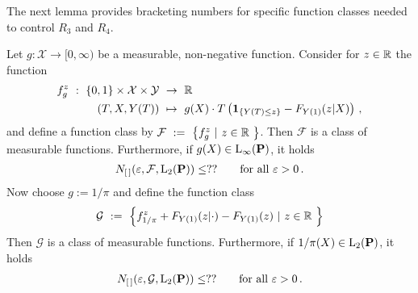 The next lemma provides bracketing numbers for specific function classes needed to control $R_3$ and $R_4$.
\newpage
\begin{lemma}
  Let
  $
  g
  :
  \mathcal{X}\to [0,\infty)
  $
  be a measurable, non-negative function.
  Consider for $z\in\R$ the function
  \begin{align*}
    f_{g}^z
    \ 
    :
    \ 
      \left\{ 0,1 \right\}
      \times
      \mathcal{X}
      \times
      \mathcal{Y}
    &
    \ 
    \to
    \ 
    \R
    \\
      (T,X,Y(T))
    &
      \ 
      \mapsto
      \ 
      g(X)
      \cdot
      T
      \left( 
        \mathbf{1}
        _{\left\{ Y(T)\le z \right\}}
        -
        F_{Y(1)}(z|X)
      \right)
      \,,
  \end{align*}
  and define a function class by
  $
    \mathcal{F}
    \ 
    :=
    \ 
    \left\{ 
      f_{g}^z
      \ 
      |
      \ 
      z\in\R\ 
    \right\}
  $.
  Then $\mathcal{F}$ is a class of measurable functions. 
  Furthermore, if $g(X)\in\mathrm{L}_\infty(\P)$, it holds 
  \begin{gather*}
    N_{[\,]}(\varepsilon,\mathcal{F},\mathrm{L}_2(\P))
    \le
    ??
    \qquad
    \text{for all}
    \ 
    \varepsilon>0
    \,.
  \end{gather*}
  Now choose $g:=1/\pi$ and define the function class
  \begin{gather*}
    \mathcal{G}
    \ 
    :=
    \ 
    \left\{ 
      f_{1/\pi}^z
      +
      F_{Y(1)}(z|\cdot)
      -
      F_{Y(1)}(z)
      \ 
      |
      \ 
      z\in\R\ 
    \right\}
  \end{gather*}
  Then $\mathcal{G}$ is a class of measurable functions. 
  Furthermore, if $1/\pi(X)\in\mathrm{L}_2(\P)$, it holds 
  \begin{gather*}
    N_{[\,]}(\varepsilon,\mathcal{G},\mathrm{L}_2(\P))
    \le
    ??
    \qquad
    \text{for all}
    \ 
    \varepsilon>0
    \,.
  \end{gather*}
\end{lemma}
